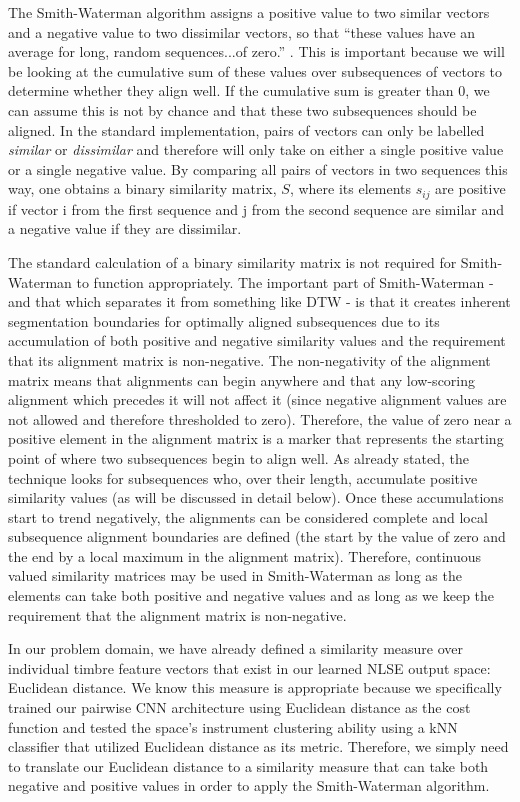 \documentclass[a4paper,12pt]{report} 	%
\numberwithin{figure}{chapter}
\numberwithin{table}{chapter}
\numberwithin{equation}{chapter}
\begin{document}
\begin{flushleft}
The Smith-Waterman algorithm assigns a positive value to two similar vectors and a negative value to two dissimilar vectors, so that ``these values have an average for long, random sequences...of zero.'' \cite[p. 196]{smith1981textordfeminineidentification}. This is important because we will be looking at the cumulative sum of these values over subsequences of vectors to determine whether they align well. If the cumulative sum is greater than $0$, we can assume this is not by chance and that these two subsequences should be aligned. In the standard implementation, pairs of vectors can only be labelled \emph{similar} or \emph{dissimilar} and therefore will only take on either a single positive value or a single negative value. By comparing all pairs of vectors in two sequences this way, one obtains a binary similarity matrix, $S$, where its elements $s_{ij}$ are positive if vector i from the first sequence and j from the second sequence are similar and a negative value if they are dissimilar.

The standard calculation of a binary similarity matrix is not required for Smith-Waterman to function appropriately. The important part of Smith-Waterman - and that which separates it from something like DTW - is that it creates inherent segmentation boundaries for optimally aligned subsequences due to its accumulation of both positive and negative similarity values and the requirement that its alignment matrix is non-negative. The non-negativity of the alignment matrix means that alignments can begin anywhere and that any low-scoring alignment which precedes it will not affect it (since negative alignment values are not allowed and therefore thresholded to zero). Therefore, the value of zero near a positive element in the alignment matrix is a marker that represents the starting point of where two subsequences begin to align well. As already stated, the technique looks for subsequences who, over their length, accumulate positive similarity values (as will be discussed in detail below). Once these accumulations start to trend negatively, the alignments can be considered complete and local subsequence alignment boundaries are defined (the start by the value of zero and the end by a local maximum in the alignment matrix). Therefore, continuous valued similarity matrices may be used in Smith-Waterman as long as the elements can take both positive and negative values and as long as we keep the requirement that the alignment matrix is non-negative.

In our problem domain, we have already defined a similarity measure over individual timbre feature vectors that exist in our learned NLSE output space: Euclidean distance. We know this measure is appropriate because we specifically trained our pairwise CNN architecture using Euclidean distance as the cost function and tested the space's instrument clustering ability using a kNN classifier that utilized Euclidean distance as its metric. Therefore, we simply need to translate our Euclidean distance to a similarity measure that can take both negative and positive values in order to apply the Smith-Waterman algorithm. 


\end{flushleft}
\end{document}
